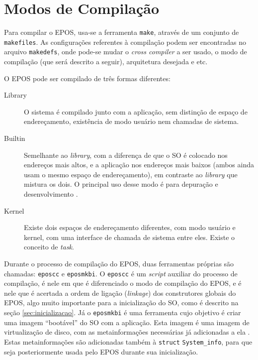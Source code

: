 

\section{Modos de Compilação}

Para compilar o EPOS, usa-se a ferramenta \verb+make+, através de um conjunto de \verb+makefiles+. As configurações referentes à compilação podem ser encontradas no arquivo \verb+makedefs+, onde pode-se mudar o \emph{cross compiler} a ser usado, o modo de compilação (que será descrito a seguir), arquitetura desejada e etc.


O EPOS pode ser compilado de três formas diferentes:

\begin{description}
\item[Library] O sistema é compilado junto com a aplicação, sem distinção de espaço de endereçamento, existência de modo usuário nem chamadas de sistema.
\item[Builtin] Semelhante ao \emph{library}, com a diferença de que o SO é colocado nos endereços mais altos, e a aplicação nos endereços mais baixos (ambos ainda usam o mesmo espaço de endereçamento), em contraste ao \emph{library} que mistura os dois. O principal uso desse modo é para depuração e desenvolvimento \cite{EPOS}.
\item[Kernel] Existe dois espaços de endereçamento diferentes, com modo usuário e kernel, com uma interface de chamada de sistema entre eles. Existe o conceito de \emph{task}.

\end{description}

Durante o processo de compilação do EPOS, duas ferramentas próprias são chamadas: \verb=eposcc= e \verb=eposmkbi=. O \verb=eposcc= é um \emph{script} auxiliar do processo de compilação, é nele em que é diferenciado o modo de compilação do EPOS, e é nele que é acertada a ordem de ligação (\emph{linkage}) dos construtores globais do EPOS, algo muito importante para a inicialização do SO, como é descrito na seção \ref{sec:inicializacao}.
Já o \verb=eposmkbi= é uma ferramenta cujo objetivo é criar uma imagem ``bootável'' do SO com a aplicação. Esta imagem é uma imagem de virtualização de disco, com as metainformações necessárias já adicionadas a ela \cite{tarcisio}. Estas metainformações são adicionadas também à \verb=struct= \verb+System_info+, para que seja posteriormente usada pelo EPOS durante sua inicialização.



